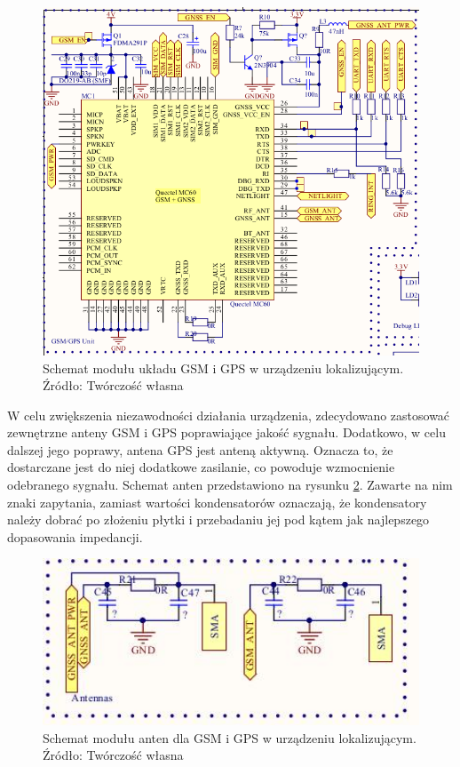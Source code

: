 \begin{figure}[H]
	\centering
	\includegraphics[width=15cm]{img/schematics/mainboard_gps_fixed.png}
	\caption{Schemat modułu układu GSM i GPS w urządzeniu lokalizującym. \\ Źródło: Twórczość własna}
	\label{fig:image_mainboard_functional_gps_gsm}
\end{figure}

W celu zwiększenia niezawodności działania urządzenia, zdecydowano zastosować zewnętrzne anteny GSM i GPS poprawiające jakość sygnału. Dodatkowo, w celu dalszej jego poprawy, antena GPS jest anteną aktywną. Oznacza to, że dostarczane jest do niej dodatkowe zasilanie, co powoduje wzmocnienie odebranego sygnału. Schemat anten przedstawiono na rysunku \ref{fig:image_mainboard_functional_gps_gsm_antennas}. Zawarte na nim znaki zapytania, zamiast wartości kondensatorów oznaczają, że kondensatory należy dobrać po złożeniu płytki i przebadaniu jej pod kątem jak najlepszego dopasowania impedancji.

\begin{figure}[H]
	\centering
	\includegraphics[width=15cm]{img/schematics/mainboard_functional_gps_gsm_antennas.jpg}
	\caption{Schemat modułu anten dla GSM i GPS w urządzeniu lokalizującym. \\ Źródło: Twórczość własna}
	\label{fig:image_mainboard_functional_gps_gsm_antennas}
\end{figure}

